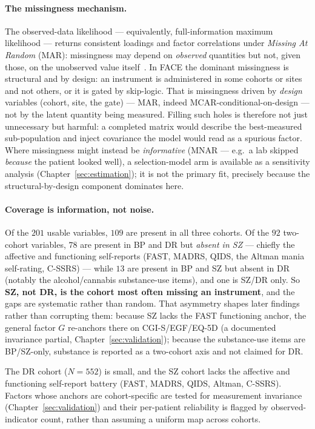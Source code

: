 \paragraph{The missingness mechanism.} The observed-data likelihood --- equivalently, full-information
maximum likelihood --- returns consistent loadings and factor correlations under \emph{Missing At Random}
(MAR): missingness may depend on \emph{observed} quantities but not, given those, on the unobserved value
itself~\cite{enders2010missing}. In FACE the dominant missingness is structural and by design: an instrument
is administered in some cohorts or sites and not others, or it is gated by skip-logic. That is missingness
driven by \emph{design} variables (cohort, site, the gate) --- MAR, indeed MCAR-conditional-on-design --- not
by the latent quantity being measured. Filling such holes is therefore not just unnecessary but harmful: a
completed matrix would describe the best-measured sub-population and inject covariance the model would read as
a spurious factor. Where missingness might instead be \emph{informative} (MNAR --- e.g.\ a lab skipped
\emph{because} the patient looked well), a selection-model arm is available as a sensitivity analysis
(Chapter~\ref{sec:estimation}); it is not the primary fit, precisely because the structural-by-design
component dominates here.

\paragraph{Coverage is information, not noise.} Of the $201$ usable variables, $109$ are present in all three
cohorts. Of the $92$ two-cohort variables, $78$ are present in BP and DR but \emph{absent in SZ} --- chiefly
the affective and functioning self-reports (FAST, MADRS, QIDS, the Altman mania self-rating, C-SSRS) --- while
$13$ are present in BP and SZ but absent in DR (notably the alcohol/cannabis substance-use items), and one is
SZ/DR only. So \textbf{SZ, not DR, is the cohort most often missing an instrument}, and the gaps are
systematic rather than random. That asymmetry shapes later findings rather than corrupting them: because SZ
lacks the FAST functioning anchor, the general factor $G$ re-anchors there on CGI-S/EGF/EQ-5D (a documented
invariance partial, Chapter~\ref{sec:validation}); because the substance-use items are BP/SZ-only, substance
is reported as a two-cohort axis and not claimed for DR.


\begin{caveatbox}
The DR cohort ($N=552$) is small, and the SZ cohort lacks the affective and functioning self-report battery
(FAST, MADRS, QIDS, Altman, C-SSRS). Factors whose anchors are cohort-specific are tested for measurement
invariance (Chapter~\ref{sec:validation}) and their per-patient reliability is flagged by observed-indicator
count, rather than assuming a uniform map across cohorts.
\end{caveatbox}

